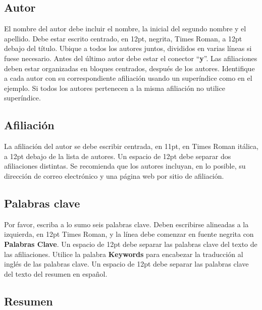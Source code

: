 \documentclass[oneside,a4paper,spanish,links]{amca}
\begin{document}
\subsection{Autor}

El nombre del autor debe incluir el nombre, la inicial del segundo
nombre y el apellido. Debe estar escrito centrado, en 12pt,
negrita, Times Roman, a 12pt debajo del título. Ubique a todos los
autores juntos, divididos en varias líneas si fuese necesario.
Antes del último autor debe estar el conector ``{\bf y}''. Las
afiliaciones deben estar organizadas en bloques centrados, después
de los autores. Identifique a cada autor con su correspondiente
afiliación usando un superíndice como en el ejemplo. Si todos los
autores pertenecen a la misma afiliación no utilice superíndice.

\subsection{Afiliación}

La afiliación del autor se debe escribir centrada, en 11pt, en
Times Roman itálica, a 12pt debajo de la lista de autores. Un
espacio de 12pt debe separar dos afiliaciones distintas. Se
recomienda que los autores incluyan, en lo posible, su dirección
de correo electrónico y una página web por sitio de afiliación.

\subsection{Palabras clave}

Por favor, escriba a lo sumo seis palabras clave. Deben escribirse
alineadas a la izquierda, en 12pt Times Roman, y la línea debe
comenzar en fuente negrita con {\bf Palabras Clave}. Un espacio de
12pt debe separar las palabras clave del texto de las
afiliaciones. Utilice la palabra {\bf Keywords} para encabezar la
traducción al inglés de las palabras clave. Un espacio de 12pt
debe separar las palabras clave del texto del resumen en español.

\subsection{Resumen}
\end{document}
